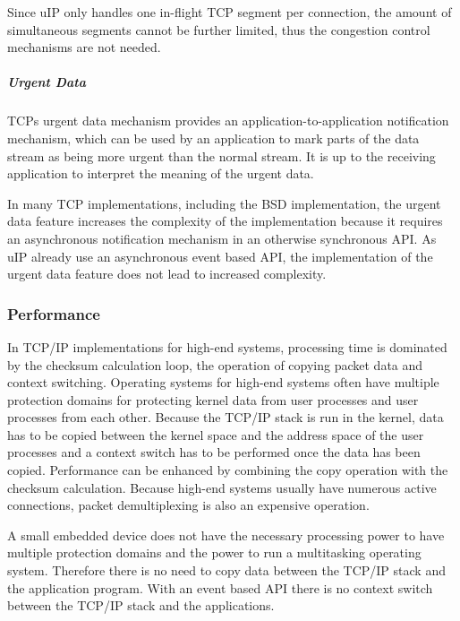 Since u\+IP only handles one in-\/flight T\+CP segment per connection, the amount of simultaneous segments cannot be further limited, thus the congestion control mechanisms are not needed.\hypertarget{a00074_urgdata}{}\subparagraph{Urgent Data}\label{a00074_urgdata}
T\+CP\textquotesingle{}s urgent data mechanism provides an application-\/to-\/application notification mechanism, which can be used by an application to mark parts of the data stream as being more urgent than the normal stream. It is up to the receiving application to interpret the meaning of the urgent data.

In many T\+CP implementations, including the B\+SD implementation, the urgent data feature increases the complexity of the implementation because it requires an asynchronous notification mechanism in an otherwise synchronous A\+PI. As u\+IP already use an asynchronous event based A\+PI, the implementation of the urgent data feature does not lead to increased complexity.\hypertarget{a00074_performance}{}\subsubsection{Performance}\label{a00074_performance}
In T\+C\+P/\+IP implementations for high-\/end systems, processing time is dominated by the checksum calculation loop, the operation of copying packet data and context switching. Operating systems for high-\/end systems often have multiple protection domains for protecting kernel data from user processes and user processes from each other. Because the T\+C\+P/\+IP stack is run in the kernel, data has to be copied between the kernel space and the address space of the user processes and a context switch has to be performed once the data has been copied. Performance can be enhanced by combining the copy operation with the checksum calculation. Because high-\/end systems usually have numerous active connections, packet demultiplexing is also an expensive operation.

A small embedded device does not have the necessary processing power to have multiple protection domains and the power to run a multitasking operating system. Therefore there is no need to copy data between the T\+C\+P/\+IP stack and the application program. With an event based A\+PI there is no context switch between the T\+C\+P/\+IP stack and the applications.

